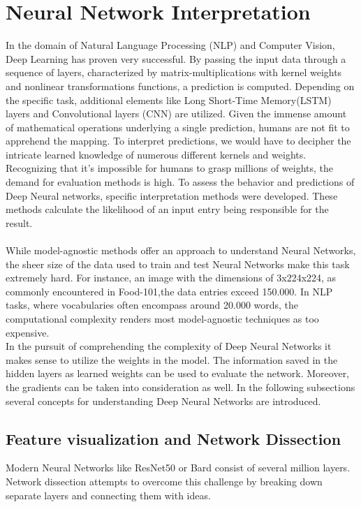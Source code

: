 \section{Neural Network Interpretation}
\label{sec:nni}
In the domain of Natural Language Processing (NLP) and Computer Vision, Deep Learning has proven very successful. By passing the input data through a sequence of layers, characterized by matrix-multiplications with kernel weights and nonlinear transformations functions, a prediction is computed. Depending on the specific task, additional elements like Long Short-Time Memory(LSTM) layers and Convolutional layers (CNN) are utilized. Given the immense amount of mathematical operations underlying a single prediction, humans are not fit to apprehend the mapping. To interpret predictions, we would have to decipher the intricate learned knowledge of numerous different kernels and weights.
Recognizing that it's impossible for humans to grasp millions of weights, the demand for evaluation methods is high. To assess the behavior and predictions of Deep Neural networks, specific interpretation methods were developed. These methods calculate the likelihood of an input entry being responsible for the result.
\\\\
While model-agnostic methods offer an approach to understand Neural Networks, the sheer size of the data used to train and test Neural Networks make this task extremely hard. For instance, an image with the dimensions of 3x224x224, as commonly encountered in Food-101,the data entries exceed 150.000. In NLP tasks, where vocabularies often encompass around 20.000 words, the computational complexity renders most model-agnostic techniques as too expensive.
\\
In the pursuit of comprehending the complexity of Deep Neural Networks it makes sense to utilize the  weights in the model. The information saved in the hidden layers  as learned weights can be used to evaluate the network. Moreover, the gradients can be taken into consideration as well.
In the following subsections several concepts for understanding Deep Neural Networks are introduced. 


\subsection{Feature visualization and Network Dissection \cite{olah2017feature} }
\label{sec:network_dissection}
Modern Neural Networks like ResNet50 or Bard consist of several million layers. Network dissection attempts to overcome this challenge by breaking down separate layers and connecting them with ideas. 

